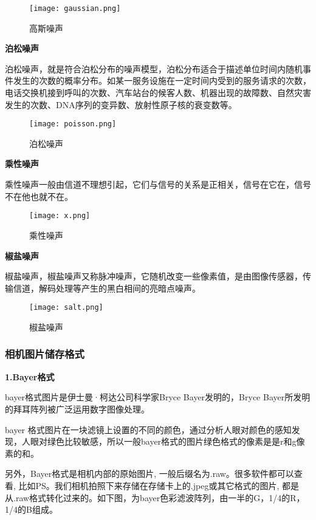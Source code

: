 \begin{figure}[H]
    \centering
    \texttt{[image: gaussian.png]}
    \caption{高斯噪声} %
    \label{fig:高斯噪声} %
\end{figure}

\textbf{泊松噪声}

泊松噪声，就是符合泊松分布的噪声模型，泊松分布适合于描述单位时间内随机事件发生的次数的概率分布。如某一服务设施在一定时间内受到的服务请求的次数，电话交换机接到呼叫的次数、汽车站台的候客人数、机器出现的故障数、自然灾害发生的次数、DNA序列的变异数、放射性原子核的衰变数等。

\begin{figure}[H]
    \centering
    \texttt{[image: poisson.png]}
    \caption{泊松噪声} %
    \label{fig:泊松噪声} %
\end{figure}

\textbf{乘性噪声}

乘性噪声一般由信道不理想引起，它们与信号的关系是正相关，信号在它在，信号不在他也就不在。

\begin{figure}[H]
    \centering
    \texttt{[image: x.png]}
    \caption{乘性噪声} %
    \label{fig:乘性噪声} %
\end{figure}

\textbf{椒盐噪声}

椒盐噪声，椒盐噪声又称脉冲噪声，它随机改变一些像素值，是由图像传感器，传输信道，解码处理等产生的黑白相间的亮暗点噪声。

\begin{figure}[H]
    \centering
    \texttt{[image: salt.png]}
    \caption{椒盐噪声} %
    \label{fig:椒盐噪声} %
\end{figure}

\subsubsection{相机图片储存格式}
\textbf{1.Bayer格式}

bayer格式图片是伊士曼·柯达公司科学家Bryce Bayer发明的，Bryce Bayer所发明的拜耳阵列被广泛运用数字图像处理。

bayer 格式图片在一块滤镜上设置的不同的颜色，通过分析人眼对颜色的感知发现，人眼对绿色比较敏感，所以一般bayer格式的图片绿色格式的像素是是r和g像素的和。

另外，Bayer格式是相机内部的原始图片, 一般后缀名为.raw。很多软件都可以查看, 比如PS。我们相机拍照下来存储在存储卡上的.jpeg或其它格式的图片, 都是从.raw格式转化过来的。如下图，为bayer色彩滤波阵列，由一半的G，1/4的R，1/4的B组成。

